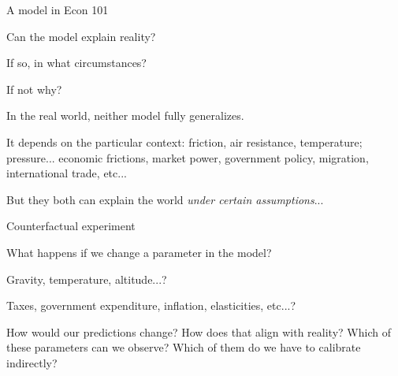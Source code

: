 \documentclass[notes,11pt, aspectratio=169, xcolor=table]{beamer}
\newenvironment{wideitemize}{\itemize\addtolength{\itemsep}{10pt}}{\enditemize}
\begin{document}
\begin{frame}{A model in Econ 101}
  \end{frame}

\begin{frame}{Can the model explain reality?}
 \begin{wideitemize}
    \item If so, in what circumstances?
    \item If not why? 
    \item In the real world, neither model fully generalizes.
    \item It depends on the particular context: friction, air resistance, temperature; pressure... economic frictions, market power, government policy, migration, international trade, etc...
    \item But they both can   explain the world \textit{under certain assumptions}...
 \end{wideitemize}
\end{frame}

\begin{frame}{Counterfactual experiment}
 \begin{wideitemize}
    \item What happens if we change a parameter in the model?
    \item Gravity, temperature, altitude...?
    \item Taxes, government expenditure, inflation, elasticities, etc...?
    \item How would our predictions change? How does that align with reality? Which of these parameters can we observe? Which of them do we have to calibrate indirectly?
 \end{wideitemize}
\end{frame}
\end{document}
